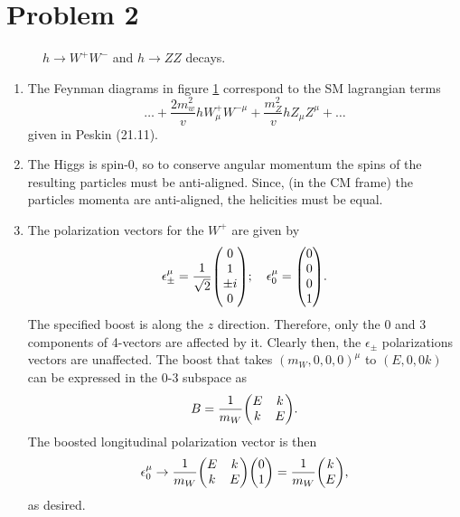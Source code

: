\documentclass[12pt]{article}
\begin{document}
\section{Problem 2}
\begin{figure}[H]
    \centering
    \caption{$h \to W^+W^-$ and $h \to ZZ$ decays.}
    \label{fig2}
\end{figure}

\begin{enumerate}[label=(\alph*)]
    \item The Feynman diagrams in figure \ref{fig2} correspond to the SM lagrangian terms
    \[ \dots + \frac{2m_w^2}{v}hW_\mu^+W^{-\mu} + \frac{m_Z^2}{v}hZ_\mu Z^\mu + \dots \]
    given in Peskin (21.11).

    \item The Higgs is spin-0, so to conserve angular momentum the spins of the resulting particles must be anti-aligned. Since, (in the CM frame) the particles momenta are anti-aligned, the helicities must be equal.
    \item The polarization vectors for the $W^+$ are given by
    \[ \epsilon_\pm^\mu = \frac{1}{\sqrt{2}}\mqty(0\\1\\\pm i\\0); \quad \epsilon_0^\mu = \mqty(0\\0\\0\\1). \]
    The specified boost is along the $\hat{z}$ direction. Therefore, only the 0 and 3 components of 4-vectors are affected by it. Clearly then, the $\epsilon_\pm$ polarizations vectors are unaffected. The boost that takes $(m_W, 0, 0, 0)^\mu$ to $(E, 0, 0 k)$ can be expressed in the 0-3 subspace as
    \[ B = \frac{1}{m_W}\mqty(E&k\\k&E). \]
    The boosted longitudinal polarization vector is then 
    \[ \epsilon_0^\mu \to \frac{1}{m_W}\mqty(E&k\\k&E)\mqty(0\\1) = \frac{1}{m_W}\mqty(k\\E), \]
    as desired.


\end{enumerate}
\end{document}

